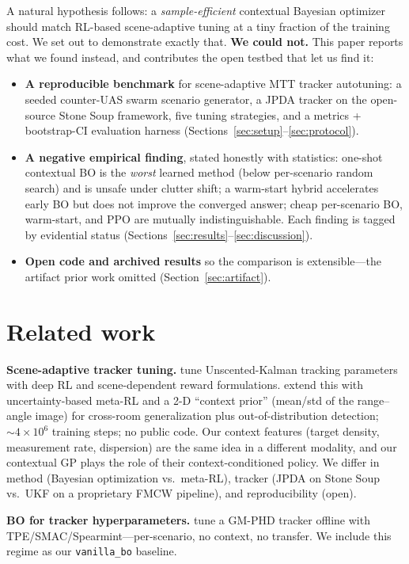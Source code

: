 \documentclass[11pt]{article}
\begin{document}
A natural hypothesis follows: a \emph{sample-efficient} contextual
Bayesian optimizer should match RL-based scene-adaptive tuning at a tiny
fraction of the training cost. We set out to demonstrate exactly that.
\textbf{We could not.} This paper reports what we found instead, and
contributes the open testbed that let us find it:

\begin{itemize}
\item \textbf{A reproducible benchmark} for scene-adaptive MTT tracker
autotuning: a seeded counter-UAS swarm scenario generator, a JPDA
tracker on the open-source Stone Soup framework, five tuning strategies,
and a metrics + bootstrap-CI evaluation harness
(Sections~\ref{sec:setup}--\ref{sec:protocol}).
\item \textbf{A negative empirical finding}, stated honestly with
statistics: one-shot contextual BO is the \emph{worst} learned method
(below per-scenario random search) and is unsafe under clutter shift; a
warm-start hybrid accelerates early BO but does not improve the
converged answer; cheap per-scenario BO, warm-start, and PPO are
mutually indistinguishable. Each finding is tagged by evidential status
(Sections~\ref{sec:results}--\ref{sec:discussion}).
\item \textbf{Open code and archived results} so the comparison is
extensible---the artifact prior work omitted
(Section~\ref{sec:artifact}).
\end{itemize}

\section{Related work}

\textbf{Scene-adaptive tracker tuning.} \citet{stephan2022} tune
Unscented-Kalman tracking parameters with deep RL and scene-dependent
reward formulations. \citet{ott2022} extend this with uncertainty-based
meta-RL and a 2-D ``context prior'' (mean/std of the range--angle
image) for cross-room generalization plus out-of-distribution
detection; ${\sim}4{\times}10^6$ training steps; no public code. Our
context features (target density, measurement rate, dispersion) are the
same idea in a different modality, and our contextual GP plays the role
of their context-conditioned policy. We differ in method (Bayesian
optimization vs.\ meta-RL), tracker (JPDA on Stone Soup vs.\ UKF on a
proprietary FMCW pipeline), and reproducibility (open).

\textbf{BO for tracker hyperparameters.} \citet{fleck2021} tune a GM-PHD
tracker offline with TPE/SMAC/Spearmint---per-scenario, no context, no
transfer. We include this regime as our \texttt{vanilla\_bo} baseline.
\end{document}
